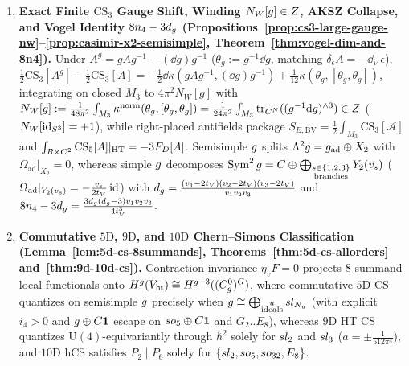 \begin{enumerate}[label=\textbf{Result~\arabic*.},leftmargin=*]
  \item \textbf{Exact Finite $\mathrm{CS}_3$ Gauge Shift, Winding $N_W[g] \in Z$, AKSZ Collapse, and Vogel Identity $8n_4 - 3d_{g}$ (Propositions~\ref{prop:cs3-large-gauge-nw}--\ref{prop:casimir-x2-semisimple}, Theorem~\ref{thm:vogel-dim-and-8n4}).} Under $A^g = g A g^{-1} - (\dd g)g^{-1}$ ($\theta_g := g^{-1}\dd g$, matching $\delta_\epsilon A = -\dd_\nabla\epsilon$), $\frac{1}{2}\mathrm{CS}_3[A^g] - \frac{1}{2}\mathrm{CS}_3[A] = -\frac{1}{2}\dd\kappa(g A g^{-1},(\dd g)g^{-1}) + \frac{1}{12}\kappa(\theta_g,[\theta_g,\theta_g])$, integrating on closed $M_3$ to $4\pi^2 N_W[g]$ with $N_W[g] := \frac{1}{48\pi^2}\int_{M_3}\kappa^{\mathrm{norm}}(\theta_g,[\theta_g,\theta_g]) = \frac{1}{24\pi^2}\int_{M_3}\operatorname{tr}_{C^N}((g^{-1}\mathrm{d} g)^{\wedge 3}) \in Z$ ($N_W[\operatorname{id}_{S^3}] = +1$), while right-placed antifields package $S_{E,\mathrm{BV}} = \frac{1}{2}\int_{M_3}\mathrm{CS}_3[\mathcal{A}]$ and $\int_{R\times C^2}\mathrm{CS}_5[A]|_{\mathrm{HT}} = -3F_D[A]$. Semisimple $g$ splits $\Lambda^2g = g_{\mathrm{ad}}\oplus X_2$ with $\Omega_{\mathrm{ad}}|_{X_2} = 0$, whereas simple $g$ decomposes $\operatorname{Sym}^2g = C\oplus\bigoplus_{\substack{s\in\{1,2,3\}\\\mathrm{branches}}}Y_2(v_s)$ ($\Omega_{\mathrm{ad}}|_{Y_2(v_s)} = -\frac{v_s}{2t_V}\operatorname{id}$) with $d_{g} = \frac{(v_1-2t_V)(v_2-2t_V)(v_3-2t_V)}{v_1 v_2 v_3}$ and $8n_4 - 3d_{g} = \frac{3d_{g}(d_{g}-3)v_1 v_2 v_3}{4t_V^3}$.

  \item \textbf{Commutative $5\mathrm{D}$, $9\mathrm{D}$, and $10\mathrm{D}$ Chern--Simons Classification (Lemma~\ref{lem:5d-cs-8summands}, Theorems~\ref{thm:5d-cs-allorders} and~\ref{thm:9d-10d-cs}).} Contraction invariance $\eta_v F = 0$ projects $8$-summand local functionals onto $H^g(V_{\mathrm{ht}})\cong H^{g+3}((C^0_{g})^G)$, where commutative $5\mathrm{D}$ CS quantizes on semisimple $g$ precisely when $g \cong \bigoplus_{\substack{u\\\mathrm{ideals}}}sl_{N_u}$ (with explicit $i_4 > 0$ and $g\oplus C\mathbf{1}$ escape on $so_5\oplus C\mathbf{1}$ and $G_2..E_8$), whereas $9\mathrm{D}$ HT CS quantizes $\mathrm{U}(4)$-equivariantly through $\hbar^2$ solely for $sl_2$ and $sl_3$ ($a = \pm\frac{1}{512\pi^4}$), and $10\mathrm{D}$ hCS satisfies $P_2 \mid P_6$ solely for $\{sl_2, so_5, so_{32}, E_8\}$.


\end{enumerate}
